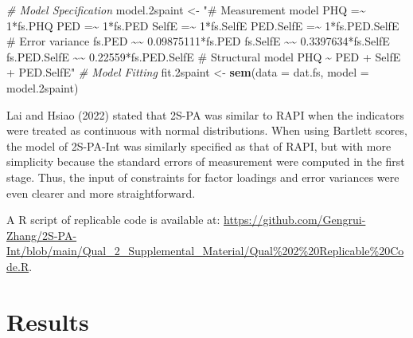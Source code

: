 \documentclass[
  man]{apa7}
\newenvironment{Shaded}{\begin{snugshade}}{\end{snugshade}}
\newcommand{\AttributeTok}[1]{\textcolor[rgb]{0.13,0.29,0.53}{#1}}
\newcommand{\CommentTok}[1]{\textcolor[rgb]{0.56,0.35,0.01}{\textit{#1}}}
\newcommand{\FloatTok}[1]{\textcolor[rgb]{0.00,0.00,0.81}{#1}}
\newcommand{\FunctionTok}[1]{\textcolor[rgb]{0.13,0.29,0.53}{\textbf{#1}}}
\newcommand{\NormalTok}[1]{#1}
\newcommand{\OtherTok}[1]{\textcolor[rgb]{0.56,0.35,0.01}{#1}}
\newcommand{\StringTok}[1]{\textcolor[rgb]{0.31,0.60,0.02}{#1}}
\begin{document}
\begin{Shaded}
\begin{Highlighting}[]
\CommentTok{\# Model Specification}
\NormalTok{model}\FloatTok{.2}\NormalTok{spaint }\OtherTok{\textless{}{-}} \StringTok{"\# Measurement model}
\StringTok{                    PHQ =\textasciitilde{} 1*fs.PHQ}
\StringTok{                    PED =\textasciitilde{} 1*fs.PED}
\StringTok{                    SelfE =\textasciitilde{} 1*fs.SelfE}
\StringTok{                    PED.SelfE =\textasciitilde{} 1*fs.PED.SelfE}
\StringTok{                  \# Error variance}
\StringTok{                    fs.PED \textasciitilde{}\textasciitilde{} 0.09875111*fs.PED}
\StringTok{                    fs.SelfE \textasciitilde{}\textasciitilde{} 0.3397634*fs.SelfE}
\StringTok{                    fs.PED.SelfE \textasciitilde{}\textasciitilde{} 0.22559*fs.PED.SelfE}
\StringTok{                  \# Structural model}
\StringTok{                    PHQ \textasciitilde{} PED + SelfE + PED.SelfE"}
\CommentTok{\# Model Fitting}
\NormalTok{fit}\FloatTok{.2}\NormalTok{spaint }\OtherTok{\textless{}{-}} \FunctionTok{sem}\NormalTok{(}\AttributeTok{data =}\NormalTok{ dat.fs, }\AttributeTok{model =}\NormalTok{ model}\FloatTok{.2}\NormalTok{spaint)}
\end{Highlighting}
\end{Shaded}

Lai and Hsiao (2022) stated that 2S-PA was similar to RAPI when the indicators were treated as continuous with normal distributions. When using Bartlett scores, the model of 2S-PA-Int was similarly specified as that of RAPI, but with more simplicity because the standard errors of measurement were computed in the first stage. Thus, the input of constraints for factor loadings and error variances were even clearer and more straightforward.

A R script of replicable code is available at: \url{https://github.com/Gengrui-Zhang/2S-PA-Int/blob/main/Qual_2_Supplemental_Material/Qual\%202\%20Replicable\%20Code.R}.

\hypertarget{results}{%
\section{Results}\label{results}}
\end{document}
